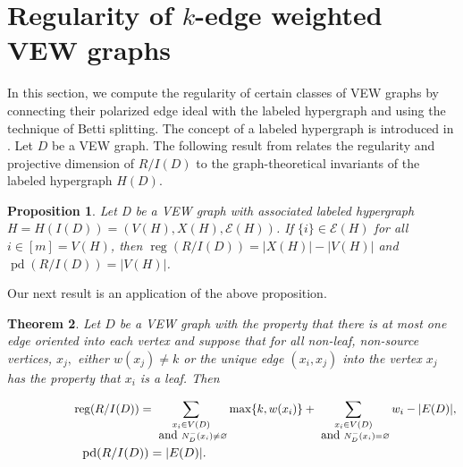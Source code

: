 \documentclass[11pt,reqno]{amsart}
\let\emptyset\varnothing
\newcommand{\pd}{\operatorname{pd}}
\newcommand{\reg}{\operatorname{reg}}
\newtheorem{theorem}{Theorem}[section]
\newtheorem{proposition}[theorem]{Proposition}
\theoremstyle{definition}
\begin{document}
	
\section{Regularity of $k$-edge weighted VEW graphs} \label{sec6}
In this section, we compute the regularity of certain classes of  VEW graphs by connecting their polarized edge ideal with the labeled hypergraph and using the technique of Betti splitting. The concept of a labeled hypergraph is introduced in
\cite{McCullough}. Let $D$ be a VEW  graph.  The following result from \cite{McCullough} relates the regularity and projective dimension of $R/I(D)$
to the graph-theoretical invariants of the labeled hypergraph $H(D).$  
\begin{proposition}\cite[Proposition 4.1]{McCullough}\label{labeled}
Let D be a VEW  graph with associated labeled hypergraph $H = H(I(D)) = (V(H), X(H), \mathcal{E}(H)) $. If
	$\{i\} \in \mathcal{E}(H)$ for all $i \in [m] = V (H)$, then $\reg(R/I(D)) = |X(H)| - |V (H)|$ and $\pd(R/I(D)) = |V (H)|$.
\end{proposition}



Our next result is an application of the above proposition.


\begin{theorem}\label{atmost-one}
Let $ D $ be a VEW graph with the property that there is at most one edge oriented into each vertex and suppose that for all non-leaf, non-source vertices, $  x_j, $ either $ w(x_j) \neq k $ or the unique edge $ (x_i, x_j ) $ into the vertex $ x_j $ has the property that $ x_i $ is a leaf.
Then

 $\hspace*{2cm}\displaystyle{  \reg(R/I(D)) = \sum_{\substack{x_i \in V(D)\\~\mbox{and}~N^{-}_D(x_i) \neq \emptyset}} {{\max\{k,{w(x_{i})}\}}} + \sum_{\substack{x_i \in V(D)\\~\mbox{and}~N^{-}_D(x_i) = \emptyset}} {{{w_{i}}}}-|E(D)|}  ,$
\vspace*{0.2cm}\\
$\hspace*{2.1cm}\displaystyle{  \pd(R/I(D)) = |E(D)|}.$ 
\end{theorem}
\end{document}
